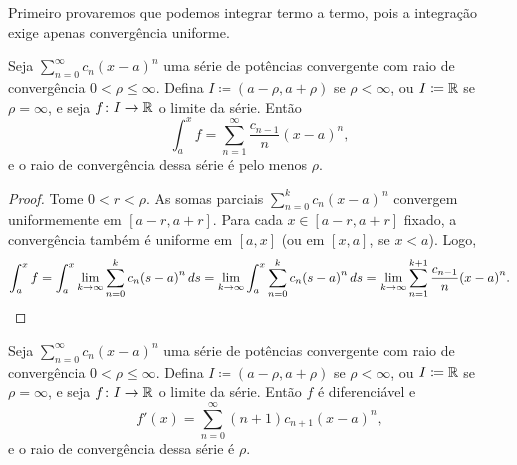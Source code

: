 Primeiro provaremos que podemos integrar termo a termo, pois a integração
exige apenas convergência uniforme.

\begin{cor}
Seja $\sum_{n=0}^\infty c_n {(x-a)}^n$ uma série de potências convergente
com raio de convergência $0 < \rho \leq \infty$.
Defina $I \coloneqq (a-\rho,a+\rho)$ se $\rho < \infty$,
ou $I \coloneqq {\mathbb{R}}$ se $\rho= \infty$, e seja $f \colon I \to {\mathbb{R}}$ o
limite da série. Então
\begin{equation*}
\int_a^x f = \sum_{n=1}^\infty \frac{c_{n-1}}{n} {(x-a)}^{n} ,
\end{equation*}
e o raio de convergência dessa série é pelo menos $\rho$.
\end{cor}

\begin{proof}
Tome $0 < r < \rho$.
As somas parciais $\sum_{n=0}^k c_n {(x-a)}^n$ convergem uniformemente em
$[a-r,a+r]$.
Para cada $x \in [a-r,a+r]$ fixado, a convergência também é uniforme em
$[a,x]$ (ou em $[x,a]$, se $x < a$).
Logo,
\begin{equation*}
\int_a^x f =
\int_a^x \lim_{k\to\infty} \sum_{n=0}^k c_n {(s-a)}^n \, ds
=
\lim_{k\to\infty}
\int_a^x \sum_{n=0}^k c_n {(s-a)}^n \, ds
=
\lim_{k\to\infty}
\sum_{n=1}^{k+1} \frac{c_{n-1}}{n} {(x-a)}^{n} . \qedhere
\end{equation*}
\end{proof}


\begin{cor} \label{cor:differentiatepowerser}
Seja $\sum_{n=0}^\infty c_n {(x-a)}^n$ uma série de potências convergente
com raio de convergência $0 < \rho \leq \infty$.
Defina $I \coloneqq (a-\rho,a+\rho)$ se $\rho < \infty$,
ou $I \coloneqq {\mathbb{R}}$ se $\rho= \infty$, e seja $f \colon I \to {\mathbb{R}}$ o
limite da série. Então $f$ é diferenciável e
\begin{equation*}
f'(x) = \sum_{n=0}^\infty (n+1) c_{n+1} {(x-a)}^{n} ,
\end{equation*}
e o raio de convergência dessa série é $\rho$.
\end{cor}


